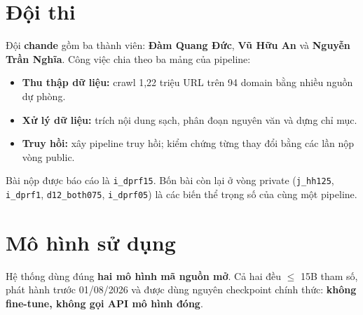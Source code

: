 \documentclass[10.5pt,a4paper]{article}
\newcommand{\code}[1]{\colorbox{brandsoft}{\small\texttt{#1}}}
\begin{document}
\vspace{4pt}
\renewcommand{\contentsname}{Mục lục}
\begingroup\titlespacing*{\section}{0pt}{6pt}{6pt}\tableofcontents\endgroup
\newpage

\section{Đội thi}

Đội \textbf{chande} gồm ba thành viên: \textbf{Đàm Quang Đức}, \textbf{Vũ Hữu An} và \textbf{Nguyễn Trần Nghĩa}. Công việc chia theo ba mảng của pipeline:

\begin{itemize}
  \item \textbf{Thu thập dữ liệu:} crawl 1,22 triệu URL trên 94 domain bằng nhiều nguồn dự phòng.
  \item \textbf{Xử lý dữ liệu:} trích nội dung sạch, phân đoạn nguyên văn và dựng chỉ mục.
  \item \textbf{Truy hồi:} xây pipeline truy hồi; kiểm chứng từng thay đổi bằng các lần nộp vòng public.
\end{itemize}

Bài nộp được báo cáo là \code{i\_dprf15}. Bốn bài còn lại ở vòng private (\texttt{j\_hh125}, \texttt{i\_dprf1}, \texttt{d12\_both075}, \texttt{i\_dprf05}) là các biến thể trọng số của cùng một pipeline.

\section{Mô hình sử dụng}

Hệ thống dùng đúng \textbf{hai mô hình mã nguồn mở}. Cả hai đều $\le$ 15B tham số, phát hành trước 01/08/2026 và được dùng nguyên checkpoint chính thức: \textbf{không fine-tune, không gọi API mô hình đóng}.
\end{document}
